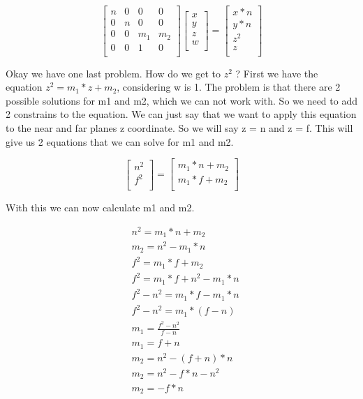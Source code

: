 \documentclass[12pt]{report} \usepackage{preamble}
\begin{document}
\[
	\begin{bmatrix}
		n & 0 & 0   & 0   \\
		0 & n & 0   & 0   \\
		0 & 0 & m_1 & m_2 \\
		0 & 0 & 1   & 0   \\
	\end{bmatrix}
	\begin{bmatrix}
		x \\
		y \\
		z \\
		w \\
	\end{bmatrix}
	=
	\begin{bmatrix}
		x * n \\
		y * n \\
		z^2   \\
		z     \\
	\end{bmatrix}
\]

Okay we have one last problem. How do we get to \(z^2\) ?
First we have the equation \(z^2 = m_1 * z + m_2\), considering w is 1.
The problem is that there are 2 possible solutions for m1 and m2, which we
can not work with. So we need to add 2 constrains to the equation.
We can just say that we want to apply this equation to the near and far planes z coordinate.
So we will say z = n and z = f. This will give us 2 equations that we can solve for m1 and m2.

\[
	\begin{bmatrix}
		n^2 \\
		f^2 \\
	\end{bmatrix}
	=
	\begin{bmatrix}
		m_1 * n + m_2 \\
		m_1 * f + m_2 \\
	\end{bmatrix}
\]

With this we can now calculate m1 and m2.

\[
	\begin{aligned}
		 & n^2 = m_1 * n + m_2           \\
		 & m_2 = n^2 - m_1 * n           \\
		 & f^2 = m_1 * f + m_2           \\
		 & f^2 = m_1 * f + n^2 - m_1 * n \\
		 & f^2 - n^2 = m_1 * f - m_1 * n \\
		 & f^2 - n^2 = m_1 * (f - n)     \\
		 & m_1 = \frac{f^2 - n^2}{f - n} \\
		 & m_1 = f + n                   \\
		 & m_2 = n^2 - (f + n) * n       \\
		 & m_2 = n^2 - f * n - n^2       \\
		 & m_2 = -f * n
	\end{aligned}
\]
\end{document}

